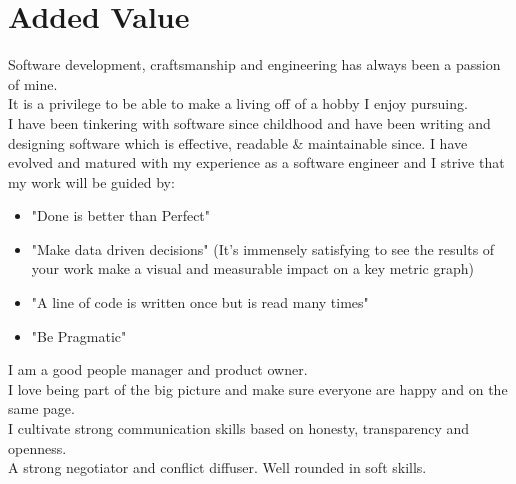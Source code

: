 \documentclass[]{friggeri-cv} %
\begin{document}
\clearpage
\section{Added Value}
Software development, craftsmanship and engineering has always been a passion of mine.\\
It is a privilege to be able to make a living off of a hobby I enjoy pursuing. \\
I have been tinkering with software since childhood and have been writing and designing software which is effective, readable \& maintainable since.
I have evolved and matured with my experience as a software engineer and I strive that my work will be guided by: \\
\begin{itemize}
\item "Done is better than Perfect"
\item "Make data driven decisions" (It's immensely satisfying to see the results of your work make a visual and measurable impact on a key metric graph)
\item "A line of code is written once but is read many times"
\item "Be Pragmatic"
\end{itemize}
I am a good people manager and product owner. \\
I love being part of the big picture and make sure everyone are happy and on the same page. \\
I cultivate strong communication skills based on honesty, transparency and openness. \\
A strong negotiator and conflict diffuser. Well rounded in soft skills.
\\
\\
\end{document}
